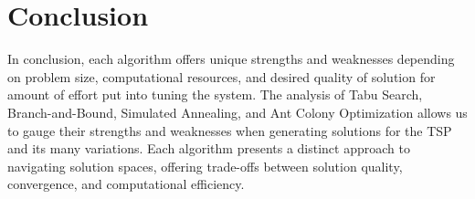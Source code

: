 \documentclass{article}
\begin{document}
\section{Conclusion}
In conclusion, each algorithm offers unique strengths and weaknesses depending on problem size, computational resources, and desired quality of solution for amount of effort put into tuning the system. The analysis of Tabu Search, Branch-and-Bound, Simulated Annealing, and Ant Colony Optimization allows us to gauge their strengths and weaknesses when generating solutions for the TSP and its many variations. Each algorithm presents a distinct approach to navigating solution spaces, offering trade-offs between solution quality, convergence, and computational efficiency. 
\pagebreak
\nocite*{}

\end{document}
